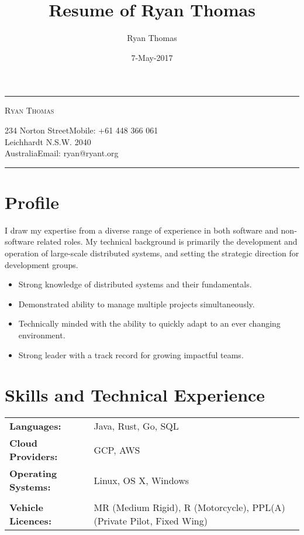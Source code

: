 \documentclass[a4paper]{article}
\author{Ryan Thomas}
\title{Resume of Ryan Thomas}
\date{7-May-2017}
\begin{document}
\newcommand{\ryanHeader}{
\begin{center}
\rule{14.1cm}{0.5mm}
\end{center}
\vspace{-0.6cm}
\begin{center}
\textsc{Ryan Thomas}
\end{center}
\vspace{-0.3cm}
234 Norton Street\hfill Mobile: +61 448 366 061~~\\
Leichhardt N.S.W. 2040\\
Australia\hfill Email: ryan@ryant.org
\vspace{-0.3cm}
\begin{center}
\rule{14.1cm}{0.5mm}
\end{center}}

\newcommand{\ryanHeaderSmall}{
\begin{center}
\rule{14.1cm}{0.5mm}
\end{center}
\vspace{-0.55cm}
\begin{center}
\textsc{Ryan Thomas}
\end{center}
\vspace{-0.8cm}
\begin{center}
\rule{14.1cm}{0.5mm}
\end{center}}

\ryanHeader
\section*{Profile}
I draw my expertise from a diverse range of experience in both software and non-software related roles. My technical background is primarily the development and operation of large-scale distributed systems, and setting the strategic direction for development groups.
\begin{itemize}
\item Strong knowledge of distributed systems and their fundamentals.
\item Demonstrated ability to manage multiple projects simultaneously.
\item Technically minded with the ability to quickly adapt to an ever changing environment.
\item Strong leader with a track record for growing impactful teams.
\end{itemize}
\section*{Skills and Technical Experience}
\begin{tabular}{l l}
\textbf{Languages:} & Java, Rust, Go, SQL\\
\textbf{Cloud Providers:} & GCP, AWS\\
\textbf{Operating Systems:} & Linux, OS X, Windows\\\\
\textbf{Vehicle Licences:}&MR (Medium Rigid), R (Motorcycle), PPL(A) (Private Pilot, Fixed Wing)\\
\end{tabular}
\vspace{5pt}
\end{document}
